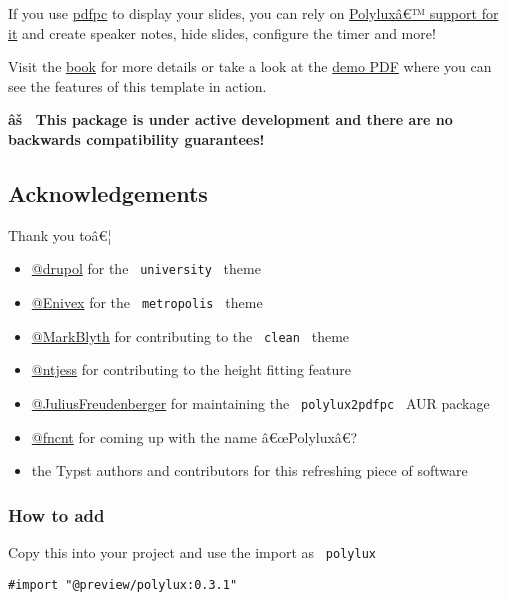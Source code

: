If you use \href{https://pdfpc.github.io/}{pdfpc} to display your
slides, you can rely on
\href{https://andreaskroepelin.github.io/polylux/book/external/pdfpc.html}{Polyluxâ€™
support for it} and create speaker notes, hide slides, configure the
timer and more!

Visit the \href{https://andreaskroepelin.github.io/polylux/book}{book}
for more details or take a look at the
\href{https://github.com/andreasKroepelin/polylux/releases/latest/download/demo.pdf}{demo
PDF} where you can see the features of this template in action.

\textbf{âš~ This package is under active development and there are no
backwards compatibility guarantees!}

\subsection{Acknowledgements}\label{acknowledgements}

Thank you toâ€¦

\begin{itemize}
\tightlist
\item
  \href{https://github.com/drupol}{@drupol} for the
  \texttt{\ university\ } theme
\item
  \href{https://github.com/Enivex}{@Enivex} for the
  \texttt{\ metropolis\ } theme
\item
  \href{https://github.com/MarkBlyth}{@MarkBlyth} for contributing to
  the \texttt{\ clean\ } theme
\item
  \href{https://github.com/ntjess}{@ntjess} for contributing to the
  height fitting feature
\item
  \href{https://github.com/JuliusFreudenberger}{@JuliusFreudenberger}
  for maintaining the \texttt{\ polylux2pdfpc\ } AUR package
\item
  \href{https://github.com/fncnt}{@fncnt} for coming up with the name
  â€œPolyluxâ€?
\item
  the Typst authors and contributors for this refreshing piece of
  software
\end{itemize}

\subsubsection{How to add}\label{how-to-add}

Copy this into your project and use the import as \texttt{\ polylux\ }

\begin{verbatim}
#import "@preview/polylux:0.3.1"
\end{verbatim}


